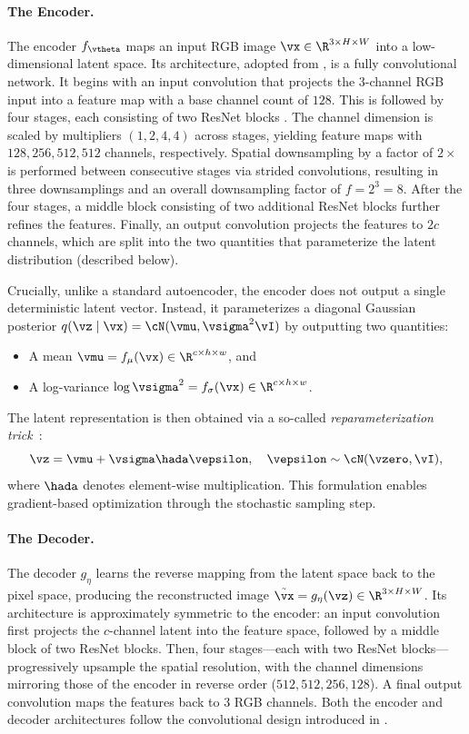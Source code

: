\documentclass[../../book-main.tex]{subfiles}
\begin{document}
\paragraph{The Encoder.}
The encoder \(f_{\vtheta}\) maps an input RGB image \(\vx \in \R^{3 \times H \times W}\) into a low-dimensional latent space.
Its architecture, adopted from \citet{esser2021taming}, is a fully convolutional network. It begins with an input convolution that projects the 3-channel RGB input into a feature map with a base channel count of \(128\).
This is followed by four stages, each consisting of two ResNet blocks \citep{he2016deep}.
The channel dimension is scaled by multipliers \((1, 2, 4, 4)\) across stages, yielding feature maps with \(128, 256, 512, 512\) channels, respectively.
Spatial downsampling by a factor of \(2\times\) is performed between consecutive stages via strided convolutions, resulting in three downsamplings and an overall downsampling factor of \(f = 2^3 = 8\).
After the four stages, a middle block consisting of two additional ResNet blocks further refines the features.
Finally, an output convolution projects the features to \(2c\) channels, which are split into the two quantities that parameterize the latent distribution (described below).

Crucially, unlike a standard autoencoder, the encoder does not output a single deterministic latent vector.
Instead, it parameterizes a diagonal Gaussian posterior \(q(\vz \mid \vx) = \cN(\vmu, \vsigma^2 \vI)\) by outputting two quantities:
\begin{itemize}
    \item A mean \(\vmu = f_{\mu}(\vx) \in \R^{c \times h \times w}\), and
    \item A log-variance \(\log \vsigma^2 = f_{\sigma}(\vx) \in \R^{c \times h \times w}\).
\end{itemize}
The latent representation is then obtained via a so-called \textit{reparameterization trick}~\citep{kingma2013auto}:
\begin{equation}
    \vz = \vmu + \vsigma \hada \vepsilon, \quad \vepsilon \sim \cN(\vzero, \vI) ,
\end{equation}
where \(\hada\) denotes element-wise multiplication.
This formulation enables gradient-based optimization through the stochastic sampling step.

\paragraph{The Decoder.}
The decoder \(g_{\eta}\) learns the reverse mapping from the latent space back to the pixel space, producing the reconstructed image \(\tilde{\vx} = g_{\eta}(\vz) \in \R^{3 \times H \times W}\).
Its architecture is approximately symmetric to the encoder: an input convolution first projects the \(c\)-channel latent into the feature space, followed by a middle block of two ResNet blocks.
Then, four stages---each with two ResNet blocks---progressively upsample the spatial resolution, with the channel dimensions mirroring those of the encoder in reverse order (\(512, 512, 256, 128\)).
A final output convolution maps the features back to 3 RGB channels.
Both the encoder and decoder architectures follow the convolutional design introduced in \citet{esser2021taming}.
\end{document}

